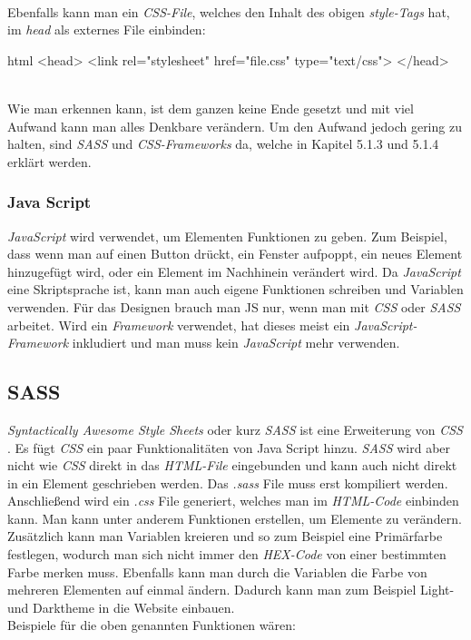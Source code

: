 	\label{list:cssbsp} ~\\
		Ebenfalls kann man ein \textit{CSS-File}, welches den Inhalt des obigen \textit{style-Tags} hat, im \textit{head} als externes File einbinden:
		\begin{code}{html}
			<head>
				<link rel="stylesheet" href="file.css" type="text/css">
			</head>
		\end{code}
	\label{list:csslink} ~\\
		Wie man erkennen kann, ist dem ganzen keine Ende gesetzt und mit viel Aufwand kann man alles Denkbare verändern. Um den Aufwand jedoch gering zu halten, sind \textit{SASS} und \textit{CSS-Frameworks} da, welche in Kapitel 5.1.3 und 5.1.4 erklärt werden.
		\subsubsection{Java Script}
		\textit{JavaScript} wird verwendet, um Elementen Funktionen zu geben. Zum Beispiel, dass wenn man auf einen Button drückt, ein Fenster aufpoppt, ein neues Element hinzugefügt wird, oder ein Element im Nachhinein verändert wird. Da \textit{JavaScript} eine Skriptsprache ist, kann man auch eigene Funktionen schreiben und Variablen verwenden. Für das Designen brauch man JS nur, wenn man mit \textit{CSS} oder \textit{SASS} arbeitet. Wird ein \textit{Framework} verwendet, hat dieses meist ein \textit{JavaScript-Framework} inkludiert und man muss kein \textit{JavaScript} mehr verwenden.
	\subsection{SASS}
	\textit{Syntactically Awesome Style Sheets} oder kurz \textit{SASS} ist eine Erweiterung von \textit{CSS} \cite{jump-start-sass}. Es fügt \textit{CSS} ein paar Funktionalitäten von Java Script hinzu. \textit{SASS} wird aber nicht wie \textit{CSS} direkt in das \textit{HTML-File} eingebunden und kann auch nicht direkt in ein Element geschrieben werden. Das \textit{.sass} File muss erst kompiliert werden. Anschließend wird ein \textit{.css} File generiert, welches man im \textit{HTML-Code} einbinden kann. Man kann unter anderem Funktionen erstellen, um Elemente zu verändern. Zusätzlich kann man Variablen kreieren und so zum Beispiel eine Primärfarbe festlegen, wodurch man sich nicht immer den \textit{HEX-Code} von einer bestimmten Farbe merken muss. Ebenfalls kann man durch die Variablen die Farbe von mehreren Elementen auf einmal ändern. Dadurch kann man zum Beispiel Light- und Darktheme in die Website einbauen.\\Beispiele für die oben genannten Funktionen wären:

